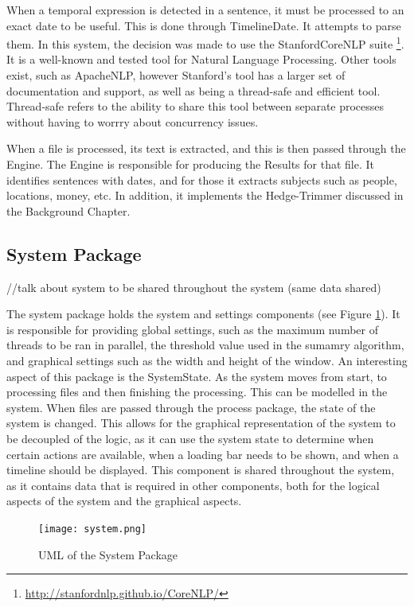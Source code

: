 \par When a temporal expression is detected in a sentence, it must be processed to an exact date to be useful. This is done through TimelineDate. It attempts to parse them. In this system, the decision was made to use the StanfordCoreNLP suite \footnote{\url{http://stanfordnlp.github.io/CoreNLP/}}. It is a well-known and tested tool for Natural Language Processing. Other tools exist, such as ApacheNLP, however Stanford's tool has a larger set of documentation and support, as well as being a thread-safe and efficient tool. Thread-safe refers to the ability to share this tool between separate processes without having to worrry about concurrency issues. 
\par When a file is processed, its text is extracted, and this is then passed through the Engine. The Engine is responsible for producing the Results for that file. It identifies sentences with dates, and for those it extracts subjects such as people, locations, money, etc. In addition, it implements the Hedge-Trimmer discussed in the Background Chapter.
\subsection{System Package}
//talk about system to be shared throughout the system (same data shared)
\par The system package holds the system and settings components (see Figure \ref{fig:system}). It is responsible for providing global settings, such as the maximum number of threads to be ran in parallel, the threshold value used in the sumamry algorithm, and graphical settings such as the width and height of the window. An interesting aspect of this package is the SystemState. As the system moves from start, to processing files and then finishing the processing. This can be modelled in the system. When files are passed through the process package, the state of the system is changed. This allows for the graphical representation of the system to be decoupled of the logic, as it can use the system state to determine when certain actions are available, when a loading bar needs to be shown, and when a timeline should be displayed. This component is shared throughout the system, as it contains data that is required in other components, both for the logical aspects of the system and the graphical aspects.
\begin{figure}[H]
\caption{UML of the System Package}
\label{fig:system}
\texttt{[image: system.png]}
\centering
\end{figure}
